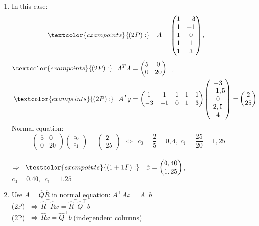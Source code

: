 {\color{solution}
\begin{enumerate}
		\item In this case: 
		$$\textcolor{exampoints}{(2P):}~~~A=\begin{pmatrix}1&-3\\1&-1\\1&0\\1&1\\1&3\end{pmatrix},~~$$
		\begin{align*}
		\textcolor{exampoints}{(2P):}~~A^TA&=\begin{pmatrix}5&0\\0&20\end{pmatrix}~~,\\
		\textcolor{exampoints}{(2P):}~~A^Ty&=\begin{pmatrix}1&1&1&1&1\\-3&-1&0&1&3\end{pmatrix}
		\begin{pmatrix}-3\\-1,5\\0\\2,5\\4\end{pmatrix}
		=\begin{pmatrix}2\\25\end{pmatrix}
		\end{align*}
		Normal equation: $$\begin{pmatrix}5&0\\0&20\end{pmatrix}
		\begin{pmatrix}c_0\\c_1\end{pmatrix}
		=\begin{pmatrix}2\\25\end{pmatrix}
		~~\Leftrightarrow~~c_0=\frac{2}{5}=0,4,~c_1=\frac{25}{20}=1,25$$\\
		$\Rightarrow~~\textcolor{exampoints}{(1+1P):}~~~\hat{x}=
		\begin{pmatrix}0,40\\1,25\end{pmatrix}$,~~~$c_0=0.40,~~ c_1=1.25$
\item Use $A=\widehat{Q}\widehat{R}$ in normal equation: $A^\top A x = A^\top b$ \\
\textcolor{exampoints}{(2P)} $~\iff~ \widehat{R}^\top \widehat{R}x = \widehat{R}^\top\widehat{Q}^\top  b$\\
\textcolor{exampoints}{(2P)} $~\iff~  \widehat{R}x =  \widehat{Q}^\top  b$ (independent columns)
\end{enumerate}
}
